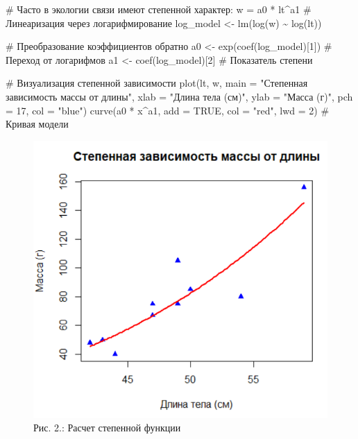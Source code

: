 \documentclass[
  letterpaper,
  DIV=11,
  numbers=noendperiod]{scrreprt}
\newenvironment{Shaded}{\begin{snugshade}}{\end{snugshade}}
\newcommand{\AttributeTok}[1]{\textcolor[rgb]{0.40,0.45,0.13}{#1}}
\newcommand{\CommentTok}[1]{\textcolor[rgb]{0.37,0.37,0.37}{#1}}
\newcommand{\ConstantTok}[1]{\textcolor[rgb]{0.56,0.35,0.01}{#1}}
\newcommand{\DecValTok}[1]{\textcolor[rgb]{0.68,0.00,0.00}{#1}}
\newcommand{\FunctionTok}[1]{\textcolor[rgb]{0.28,0.35,0.67}{#1}}
\newcommand{\NormalTok}[1]{\textcolor[rgb]{0.00,0.23,0.31}{#1}}
\newcommand{\OtherTok}[1]{\textcolor[rgb]{0.00,0.23,0.31}{#1}}
\newcommand{\SpecialCharTok}[1]{\textcolor[rgb]{0.37,0.37,0.37}{#1}}
\newcommand{\StringTok}[1]{\textcolor[rgb]{0.13,0.47,0.30}{#1}}
\begin{document}
\begin{Shaded}
\begin{Highlighting}[]
\CommentTok{\# Часто в экологии связи имеют степенной характер: w = a0 * lt\^{}a1}
\CommentTok{\# Линеаризация через логарифмирование}
\NormalTok{log\_model }\OtherTok{\textless{}{-}} \FunctionTok{lm}\NormalTok{(}\FunctionTok{log}\NormalTok{(w) }\SpecialCharTok{\textasciitilde{}} \FunctionTok{log}\NormalTok{(lt))}

\CommentTok{\# Преобразование коэффициентов обратно}
\NormalTok{a0 }\OtherTok{\textless{}{-}} \FunctionTok{exp}\NormalTok{(}\FunctionTok{coef}\NormalTok{(log\_model)[}\DecValTok{1}\NormalTok{])  }\CommentTok{\# Переход от логарифмов}
\NormalTok{a1 }\OtherTok{\textless{}{-}} \FunctionTok{coef}\NormalTok{(log\_model)[}\DecValTok{2}\NormalTok{]       }\CommentTok{\# Показатель степени}

\CommentTok{\# Визуализация степенной зависимости}
\FunctionTok{plot}\NormalTok{(lt, w, }
     \AttributeTok{main =} \StringTok{"Степенная зависимость массы от длины"}\NormalTok{, }
     \AttributeTok{xlab =} \StringTok{"Длина тела (см)"}\NormalTok{, }
     \AttributeTok{ylab =} \StringTok{"Масса (г)"}\NormalTok{,}
     \AttributeTok{pch =} \DecValTok{17}\NormalTok{,}
     \AttributeTok{col =} \StringTok{"blue"}\NormalTok{)}
\FunctionTok{curve}\NormalTok{(a0 }\SpecialCharTok{*}\NormalTok{ x}\SpecialCharTok{\^{}}\NormalTok{a1, }\AttributeTok{add =} \ConstantTok{TRUE}\NormalTok{, }\AttributeTok{col =} \StringTok{"red"}\NormalTok{, }\AttributeTok{lwd =} \DecValTok{2}\NormalTok{)  }\CommentTok{\# Кривая модели}
\end{Highlighting}
\end{Shaded}

\begin{figure}[H]

{\centering \includegraphics[width=0.6\linewidth,height=\textheight,keepaspectratio]{images/KOROSOV2.PNG}

}

\caption{Рис. 2.: Расчет степенной функции}

\end{figure}%
\end{document}
